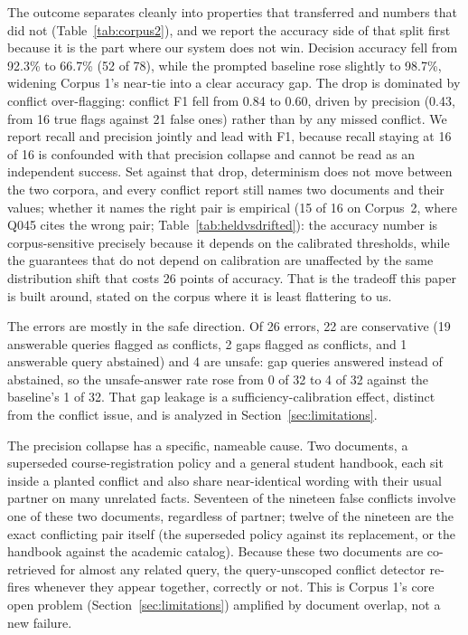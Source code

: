 \documentclass[conference]{IEEEtran}
\begin{document}
The outcome separates cleanly into properties that transferred and numbers
that did not (Table~\ref{tab:corpus2}), and we report the accuracy side of
that split first because it is the part where our system does not win.
Decision accuracy fell from 92.3\% to
66.7\% (52 of 78), while the prompted baseline rose slightly to 98.7\%,
widening Corpus 1's near-tie into a clear accuracy gap. The drop is dominated
by conflict over-flagging: conflict F1 fell from 0.84 to 0.60, driven by
precision (0.43, from 16 true flags against 21 false ones) rather than by any
missed conflict. We report recall and precision jointly and lead with F1,
because recall staying at 16 of 16 is confounded with that precision collapse
and cannot be read as an independent success. Set against that drop,
determinism does not move between the two corpora, and every conflict
report still names two documents and their values; whether it names the
right pair is empirical (15 of 16 on Corpus~2, where Q045 cites the wrong
pair; Table~\ref{tab:heldvsdrifted}): the accuracy number is corpus-sensitive
precisely because it depends on the calibrated thresholds, while the
guarantees that do not depend on calibration are unaffected by the same
distribution shift that costs 26 points of accuracy. That is the tradeoff
this paper is built around, stated on the corpus where it is least
flattering to us.

The errors are mostly in the safe direction. Of 26 errors, 22 are conservative
(19 answerable queries flagged as conflicts, 2 gaps flagged as conflicts, and
1 answerable query abstained) and 4 are unsafe: gap queries answered instead
of abstained, so the unsafe-answer rate rose from 0 of 32 to 4 of 32 against
the baseline's 1 of 32. That gap leakage is a sufficiency-calibration effect,
distinct from the conflict issue, and is analyzed in
Section~\ref{sec:limitations}.

The precision collapse has a specific, nameable cause. Two documents, a
superseded course-registration policy and a general student handbook, each
sit inside a planted conflict and also share near-identical wording with
their usual partner on many unrelated facts. Seventeen of the nineteen false
conflicts involve one of these two documents, regardless of partner; twelve
of the nineteen are the exact conflicting pair itself (the superseded policy
against its replacement, or the handbook against the academic catalog).
Because these two documents are co-retrieved for almost any related query,
the query-unscoped conflict detector re-fires whenever they appear together,
correctly or not. This is Corpus 1's core open problem
(Section~\ref{sec:limitations}) amplified by document overlap, not a new
failure.
\end{document}
